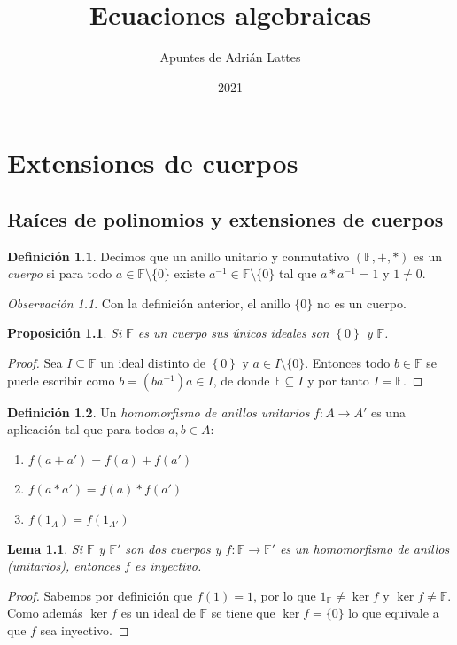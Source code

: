 \documentclass[10pt, spanish]{report}
\title{Ecuaciones algebraicas}
\author{Apuntes de Adrián Lattes}
\date{2021}
\newtheorem{lema}[tma]{Lema}
\newtheorem{prop}[tma]{Proposición}
\theoremstyle{definition}
\newtheorem*{defin}{Definición}
\theoremstyle{custom}
\theoremstyle{remark}
\newtheorem*{obs}{Observación}
\newcommand{\F}{\mathbb{F}}
\newcommand{\fecha}[1]{\marginpar{\underline{\footnotesize{#1}}}}
\begin{document}
\maketitle

\newpage
\hspace{0pt}

\chapter{Extensiones de cuerpos}
\fecha{15/02}
\section{Raíces de polinomios y extensiones de cuerpos}

\begin{defin}
    \label{def:cuerpo}
    Decimos que un anillo unitario y conmutativo $(\F,+,*)$ es un
    \textit{cuerpo} si para todo $a\in \F\setminus\{0\}$ existe $a^{-1}\in
    \F\setminus\{0\}$ tal que $a*a^{-1}=1$ y $1\neq 0$.
\end{defin}

\begin{obs}
    Con la definición anterior, el anillo $\{0\}$ no es un cuerpo.
\end{obs}

\begin{prop}
    Si $\F$ es un cuerpo sus únicos ideales son $\left\{ 0 \right\}$ y $\F$.
\end{prop}
\begin{proof}
    Sea $I\subseteq \F$ un ideal distinto de $\left\{ 0 \right\}$ y $a\in
    I\setminus\{0\}$. Entonces todo $b\in\F$ se puede escribir como
    $b=(ba^{-1})a\in I$, de donde $\F\subseteq I$ y por tanto $I=\F$.
\end{proof}

\begin{defin}
    Un \textit{homomorfismo de anillos unitarios} $f:A\to A'$ es una aplicación
    tal que para todos $a,b\in A$:
    \begin{enumerate}
        \item $f(a+a')=f(a)+f(a')$
        \item $f(a*a')=f(a)*f(a')$
        \item $f(1_A)=f(1_{A'})$
    \end{enumerate}
\end{defin}

\begin{lema}
    Si $\F$ y $\F'$ son dos cuerpos y $f: \F\to\F'$ es un homomorfismo de
    anillos (unitarios), entonces $f$ es inyectivo.
\end{lema}
\begin{proof}
    Sabemos por definición que $f(1)=1$, por lo que $1_\F\neq \ker{f}$ y
    $\ker{f}\neq \F$. Como además $\ker{f}$ es un ideal de $\F$ se tiene que
    $\ker{f}=\{0\}$ lo que equivale a que $f$ sea inyectivo.
\end{proof}
\end{document}
